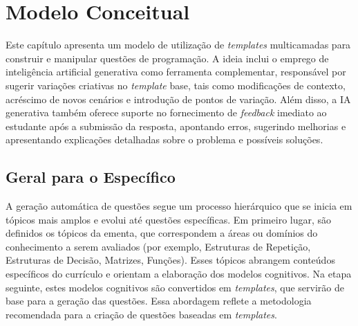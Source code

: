 \chapter{Modelo Conceitual}

Este capítulo apresenta um modelo de utilização de \textit{templates} multicamadas para construir e manipular questões de programação. A ideia inclui o emprego de inteligência artificial generativa como ferramenta complementar, responsável por sugerir variações criativas no \textit{template} base, tais como modificações de contexto, acréscimo de novos cenários e introdução de pontos de variação. Além disso, a IA generativa também oferece suporte no fornecimento de \textit{feedback} imediato ao estudante após a submissão da resposta, apontando erros, sugerindo melhorias e apresentando explicações detalhadas sobre o problema e possíveis soluções. 

\section{Geral para o Específico}
A geração automática de questões segue um processo hierárquico que se inicia em tópicos mais amplos e evolui até questões específicas. Em primeiro lugar, são definidos os tópicos da ementa, que correspondem a áreas ou domínios do conhecimento a serem avaliados (por exemplo, Estruturas de Repetição, Estruturas de Decisão, Matrizes, Funções). Esses tópicos abrangem conteúdos específicos do currículo e orientam a elaboração dos modelos cognitivos. Na etapa seguinte, estes modelos cognitivos são convertidos em \textit{templates}, que servirão de base para a geração das questões. Essa abordagem reflete a metodologia recomendada para a criação de questões baseadas em \textit{templates}. 

